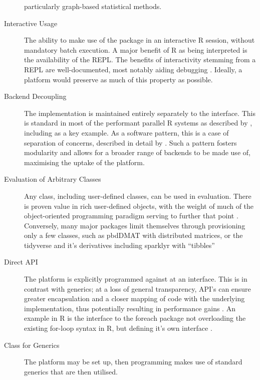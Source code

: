 \documentclass[a4paper,10pt]{article}
\begin{document}
\begin{description}
	      particularly graph-based statistical methods.
	\item[Interactive Usage]
	      The ability to make use of the package in an interactive R
	      session, without mandatory batch execution.
	      A major benefit of R as being interpreted is the availability
	      of the REPL. The benefits of interactivity stemming from a REPL
	      are well-documented, most notably aiding debugging
	      \cite{mccarthy1978history}.
	      Ideally, a platform would preserve as much of this property as
	      possible.
	\item[Backend Decoupling]
	      The implementation is maintained entirely separately to the
	      interface.
	      This is standard in most of the performant parallel R systems
	      as described by \cite{eddelbuettel2019parallel}, including
	      \cite{microsoft20} as a key example.
	      As a software pattern, this is a case of separation of
	      concerns, described in detail by \cite{dijkstra1982role}.
	      Such a pattern fosters modularity and allows for a broader
	      range of backends to be made use of, maximising the uptake of
	      the platform.
	\item[Evaluation of Arbitrary Classes]
	      Any class, including user-defined classes, can be used in
	      evaluation.
	      There is proven value in rich user-defined objects, with the
	      weight of much of the object-oriented programming paradigm
	      serving to further that point \cite{dahl2004simula}.
	      Conversely, many major packages limit themselves through
	      provisioning only a few classes, such as pbdDMAT with
	      distributed matrices, or the tidyverse and it's derivatives
	      including sparklyr with ``tibbles'' \cite{pbdDMATpackage}
	      \cite{wickham2019welcome}
	\item[Direct API]
	      The platform is explicitly programmed against at an interface.
	      This is in contrast with generics;
	      at a loss of general transparency, API's can ensure greater
	      encapsulation and a closer mapping of code with the underlying
	      implementation, thus potentially resulting in performance gains
	      \cite{bierhoff2009api}.
	      An example in R is the interface to the foreach package not
	      overloading the existing for-loop syntax in R, but defining
	      it's own interface \cite{microsoft20}.
	\item[Class for Generics]
	      The platform may be set up, then programming makes use of
	      standard generics that are then utilised.

\end{description}
\end{document}
